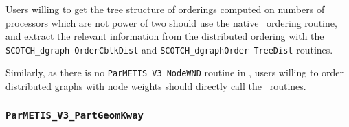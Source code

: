 \begin{itemize}
Users willing to get the tree structure of orderings computed on
numbers of processors which are not power of two should use the native
\ptscotch\ ordering routine, and extract the relevant information from
the distributed ordering with the {\tt SCOTCH\_\lbt dgraph\lbt
Order\lbt Cblk\lbt Dist} and {\tt SCOTCH\_\lbt dgraph\lbt Order\lbt
Tree\lbt Dist} routines.

Similarly, as there is no {\tt ParMETIS\_V3\_NodeWND} routine in
\parmetis, users willing to order distributed graphs with node weights
should directly call the \ptscotch\ routines.
\end{itemize}

\subsubsection{{\tt ParMETIS\_V3\_PartGeomKway}}

